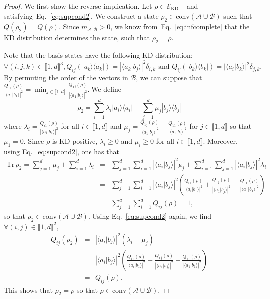\documentclass[a4paper, notitlepage, 11pt]{article}
\numberwithin{equation}{section}
\newcommand{\bra}[1]{\langle #1|}
\newcommand{\cket}[1]{|#1\rangle}
\newcommand{\bracket}[2]{\langle #1|#2\rangle}
\newcommand{\mcl}[1]{\mathcal{#1}}
\newcommand{\Acal}{{\mathcal A}}
\newcommand{\Bcal}{{\mathcal B}}
\newcommand{\EcalKDC}{{\mathcal E}_{\mathrm{KD+}}}
\newcommand{\mab}{m_{\Acal,\Bcal}}
\newcommand{\Tr}{\mathrm{Tr}\,}
\newcommand{\conv}[1]{\mathrm{conv}\left(#1\right)}
\newcommand{\IntEnt}[2]{\llbracket #1 , #2 \rrbracket}
\newcommand{\convAB}{\conv{\Acal \cup \Bcal}}
\begin{document}
\begin{proof}
We first show the reverse implication. 
Let $\rho \in \EcalKDC$ and satisfying~Eq.~\eqref{eq:supcond2}. We construct a state $\rho_2 \in \convAB$ such that $Q(\rho_2) = Q(\rho)$. Since $\mab>0$, we know from~Eq.~\eqref{eq:infcomplete} that the KD distribution determines the state, such that $\rho_2 = \rho$.

Note that the basis states have the following KD distribution: 
\[
\forall (i,j,k)\in\IntEnt{1}{d}^3, Q_{ij}(\cket{a_k}\bra{a_k}) = \left|\bracket{a_k}{b_j}\right|^2\delta_{i,k} \text{ and } Q_{ij}(\cket{b_k}\bra{b_k}) = \left|\bracket{a_i}{b_k}\right|^2 \delta_{j,k}.
\]
By permuting the order of the vectors in $\mcl{B}$, we can suppose that $\frac{Q_{11}(\rho)}{\left|\bracket{a_1}{b_1}\right|^2} =  \min_{j\in\IntEnt{1}{d}} \frac{Q_{1j}(\rho)}{\left|\bracket{a_1}{b_j}\right|^2}$. We define 
\[
\rho_{2} = \sum_{i=1}^{d}\lambda_{i}\cket{a_i}\bra{a_i} + \sum_{j=1}^{d}\mu_{j}\cket{b_j}\bra{b_j}
\]
where $\lambda_{i} = \frac{Q_{i1}(\rho)}{\left|\bracket{a_i}{b_1}\right|^2}$ for all $i\in\IntEnt{1}{d}$ and $\mu_{j} = \frac{Q_{1j}(\rho)}{\left|\bracket{a_1}{b_j}\right|^2}-\frac{Q_{11}(\rho)}{\left|\bracket{a_1}{b_1}\right|^2}$ for $j\in\IntEnt{1}{d}$ so that $\mu_{1}=0$.
Since $\rho$ is KD positive, $\lambda_{i}\geqslant 0$ and $\mu_{i}\geqslant 0$ for all $i\in\IntEnt{1}{d}$. Moreover, using Eq.~\eqref{eq:supcond2}, one has that
\[
\begin{array}{rcl}
\displaystyle \Tr \rho_2=\sum_{j=1}^{d} \mu_{j} +\sum_{i=1}^{d} \lambda_{i} &=&  \sum_{j=1}^{d} \sum_{i=1}^{d} \left|\bracket{a_i}{b_j}\right|^2\mu_{j} + \sum_{i=1}^{d} \sum_{j=1}^{d} \left|\bracket{a_i}{b_j}\right|^2 \lambda_{i}  \\
&=& \displaystyle \sum_{j=1}^{d} \sum_{i=1}^{d} \left|\bracket{a_i}{b_j}\right|^2\left(\frac{Q_{i1}(\rho)}{\left|\bracket{a_i}{b_1}\right|^2} + \frac{Q_{1j}(\rho)}{\left|\bracket{a_1}{b_j}\right|^2}-\frac{Q_{11}(\rho)}{\left|\bracket{a_1}{b_1}\right|^2} \right) \\
&=& \displaystyle \sum_{j=1}^{d} \sum_{i=1}^{d} Q_{ij}(\rho) = 1,
\end{array} 
\]
so that $\rho_2\in\convAB$.  
Using Eq.~\eqref{eq:supcond2} again, we find $\forall (i,j)\in\IntEnt{1}{d}^2,$
\[
 \begin{array}{rcl}
 Q_{ij}(\rho_{2}) &=& \left|\bracket{a_i}{b_j}\right|^2\left(\lambda_{i}+\mu_{j}\right) \\
 & = &  \left|\bracket{a_i}{b_j}\right|^2\left( \frac{Q_{i1}(\rho)}{\left|\bracket{a_i}{b_1}\right|^2}+ \frac{Q_{1j}(\rho)}{\left|\bracket{a_1}{b_j}\right|^2}-\frac{Q_{11}(\rho)}{\left|\bracket{a_1}{b_1}\right|^2}\right) \\
 &=& Q_{ij}(\rho).
 \end{array}
\]
This shows that $\rho_2=\rho$ so that $\rho\in\convAB$. 


\end{proof}
\end{document}
